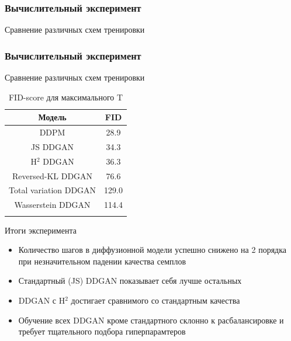 \documentclass[8pt]{beamer}
\begin{document}
\begin{frame}
	\frametitle{Вычислительный эксперимент}
		\begin{block}{Сравнение различных схем тренировки}
			\begin{figure}[H]
			\end{figure}
		\end{block}
\end{frame}

\begin{frame}
	\frametitle{Вычислительный эксперимент}
	\begin{block}{Сравнение различных схем тренировки}
		\begin{longtable}{|c|c|}
			\hline
			Модель &  FID\\
			\hline
			DDPM &  28.9\\ 
			\hline
			JS DDGAN & 34.3 \\
			\hline
			H$^2$ DDGAN &  36.3\\
			\hline
			Reversed-KL DDGAN &  76.6\\
			\hline
			Total variation DDGAN &  129.0\\
			\hline
			Wasserstein DDGAN &  114.4\\
			\hline
			\caption*{FID-score для максимального T}
		\end{longtable}
	\end{block}
	\begin{block}{Итоги эксперимента}
		\begin{itemize}
			\item Количество шагов в диффузионной модели успешно снижено на 2 порядка при незначительном падении качества семплов
			\item Стандартный (JS) DDGAN показывает себя лучше остальных
			\item DDGAN с H$^2$ достигает сравнимого со стандартным качества
			\item Обучение всех DDGAN кроме стандартного склонно к расбалансировке и требует тщательного подбора гиперпарамтеров
			
		\end{itemize}
	\end{block}
\end{frame}
\end{document}
